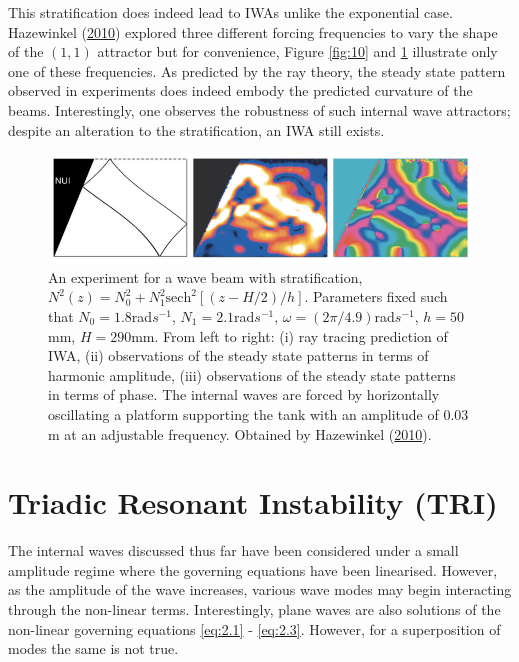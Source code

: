 \documentclass[a4paper]{article}
\numberwithin{equation}{section}
\begin{document}
This stratification does indeed lead to IWAs unlike the exponential case. Hazewinkel (\hyperlink{ref 24}{2010}) explored three different forcing frequencies to vary the shape of the $(1,1)$ attractor but for convenience, Figure \ref{fig:10} and \ref{fig:11} illustrate only one of these frequencies. As predicted by the ray theory, the steady state pattern observed in experiments does indeed embody the predicted curvature of the beams. Interestingly, one observes the robustness of such internal wave attractors; despite an alteration to the stratification, an IWA still exists.
\begin{figure}[h!]
  \includegraphics[scale=0.9, center]{Images/one forcing}
  \caption{An experiment for a wave beam with stratification, $N^2(z) = N^2_0 + N^2_1 \text{sech}^2[(z-H/2)/h]$. Parameters fixed such that $N_0 = 1.8$rad$s^{-1}$, $N_1 = 2.1$rad$s^{-1}$, $\omega = (2\pi/4.9)$rad$s^{-1}$, $h = 50$mm, $H=290$mm. From left to right: (i) ray tracing prediction of IWA, (ii) observations of the steady state patterns in terms of harmonic amplitude, (iii) observations of the steady state patterns in terms of phase. The internal waves are forced by horizontally oscillating a platform supporting the tank with an amplitude of $0.03$m at an adjustable frequency. Obtained by Hazewinkel (\protect\hyperlink{ref 24}{2010}).}
  \label{fig:estimated_mean}
  \label{fig:11}
\end{figure}
\section{Triadic Resonant Instability (TRI)}
\label{sec:6}
The internal waves discussed thus far have been considered under a small amplitude regime where the governing equations have been linearised. However, as the amplitude of the wave increases, various wave modes may begin interacting through the non-linear terms. Interestingly, plane waves are also solutions of the non-linear governing equations \eqref{eq:2.1} - \eqref{eq:2.3}. However, for a superposition of modes the same is not true. 
\end{document}
